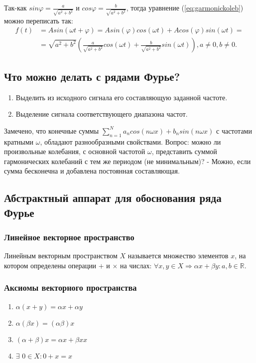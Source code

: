 \documentclass[a4paper, 12pt]{article}
\begin{document}
    Так-как $sin\varphi = \frac{a}{\sqrt{a^2 + b^2}}$ и $cos\varphi = \frac{b}{\sqrt{a^2 + b^2}}$, тогда уравнение (\ref{eq:garmonickoleb}) можно переписать так:
    \begin{equation*}
    \begin{aligned}
        f(t) &= Asin(\omega t + \varphi) = Asin(\varphi)cos(\omega t) + Acos(\varphi)sin(\omega t) =\\
        &= \sqrt{a^2 + b^2}\left(\frac{a}{\sqrt{a^2 + b^2}}cos(\omega t) + \frac{b}{\sqrt{a^2 + b^2}}sin(\omega t)\right), a \neq 0, b \neq 0.
    \end{aligned}
    \end{equation*}

    \subsection{Что можно делать с рядами Фурье?}
    \begin{enumerate}
        \item Выделить из исходного сигнала его составляющую заданной частоте.
        \item Выделение сигнала соответствующего диапазона частот.
    \end{enumerate}

    Замечено, что конечные суммы $\sum_{n=1}^{N} a_n cos(n\omega x) + b_nsin(n\omega x)$ с частотами кратными $\omega$, обладают разнообразными свойствами. Вопрос: можно ли произвольные колебания, с основной частотой $\omega$, представить суммой гармонических колебаний с тем же периодом (не минимальным)? - Можно, если сумма бесконечна и добавлена постоянная составляющая.

    \subsection{Абстрактный аппарат для обоснования ряда Фурье}
    \subsubsection{Линейное векторное пространство}
    Линейным векторным пространством $X$ называется множество элементов $x$, на котором определены операции $+$ и $\times$ на числах: $\forall x,y \in X \Rightarrow \alpha x + \beta y: a, b \in \mathbb{R}$.
    \subsubsection{Аксиомы векторного пространства}
    \begin{enumerate}
        \item $\alpha(x + y) = \alpha x + \alpha y$
        \item $\alpha(\beta x) = (\alpha \beta) x$
        \item $(\alpha + \beta) x = \alpha x + \beta x x$
        \item $\exists$ $0 \in X : 0 + x = x$
    \end{enumerate}
\end{document}
